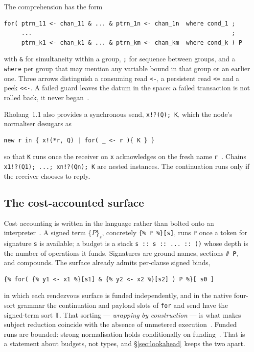\documentclass[11pt]{article}
\theoremstyle{definition}
\theoremstyle{plain}
\theoremstyle{remark}
\newcommand{\T}{\mathbb{T}}
\newcommand{\signed}[2]{\{#1\}_{#2}}
\begin{document}
The comprehension has the form
\begin{lstlisting}
for( ptrn_11 <- chan_11 & ... & ptrn_1n <- chan_1n  where cond_1 ;
     ...                                                         ;
     ptrn_k1 <- chan_k1 & ... & ptrn_km <- chan_km  where cond_k ) P
\end{lstlisting}
with \texttt{\&} for simultaneity within a group, \texttt{;} for sequence
between groups, and a \texttt{where} per group that may mention any variable
bound in that group or an earlier one. Three arrows distinguish a consuming
read \texttt{<-}, a persistent read \texttt{<=} and a peek \texttt{<<-}. A
failed guard leaves the datum in the space: a failed transaction is not rolled
back, it never began~\cite{F1R3Dev}.

Rholang~1.1 also provides a synchronous send, \verb|x!?(Q); K|, which the
node's normaliser desugars as
\begin{lstlisting}
new r in { x!(*r, Q) | for( _ <- r ){ K } }
\end{lstlisting}
so that \texttt{K} runs once the receiver on \texttt{x} acknowledges on the
fresh name \texttt{r}~\cite{f1r3nodeOTE}. Chains
\verb|x1!?(Q1); ...; xn!?(Qn); K| are nested instances. The continuation runs
only if the receiver chooses to reply.

\subsection{The cost-accounted surface}

Cost accounting is written in the language rather than bolted onto an
interpreter~\cite{CostRho}. A signed term \(\signed{P}{s}\), concretely
\verb|{% P %}[s]|, runs \texttt{P} once a token for signature \texttt{s} is
available; a budget is a stack \verb|s :: s :: ... :: ()| whose depth is the
number of operations it funds. Signatures are ground names, sections
\verb|# P|, and compounds. The surface already admits per-clause signed binds,
\begin{lstlisting}
{% for( {% y1 <- x1 %}[s1] & {% y2 <- x2 %}[s2] ) P %}[ s0 ]
\end{lstlisting}
in which each rendezvous surface is funded independently, and in the native
four-sort grammar the continuation and payload slots of \texttt{for} and send
have the signed-term sort \(\T\). That sorting --- \emph{wrapping by
construction} --- is what makes subject reduction coincide with the absence of
unmetered execution~\cite{CostMonad}. Funded runs are bounded: strong
normalisation holds conditionally on funding~\cite{f1r3nodeOTE}. That is a
statement about budgets, not types, and \S\ref{sec:lookahead} keeps the two
apart.
\end{document}
